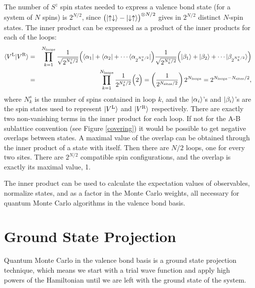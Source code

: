 The number of $S^z$ spin states needed to express a valence bond state (for a system of $N$ spins) is $2^{N/2}$, since $\big(\lvert {\uparrow\downarrow} \rangle-\lvert {\downarrow\uparrow} \rangle \big)^{\otimes N/2}$ gives in $2^{N/2}$ distinct $N$-spin states. 
The inner product can be expressed as a product of the inner products for each of the loops:
\begin{eqnarray}
\langle{V^\text{L}}\vert{V^\text{R}}\rangle &= &
				\prod^{N_{\text{loops}}}_{k=1}
				\frac{1}
				{\sqrt{2^{N^s_k/2}}}
				\Big( \langle {\alpha_1} \rvert + \langle {\alpha_2} \rvert + \cdots \langle {\alpha_{2^{N^s_k/2}}} \rvert\Big)
				\frac{1}
				{\sqrt{2^{N^s_k/2}}} \nonumber
				\Big( \lvert {\beta_1} \rangle + \lvert {\beta_2} \rangle + \cdots \lvert {\beta_{2^{N^s_k/2}}} \rangle\Big)\\
				&=&\prod^{N_{\text{loops}}}_{k=1}
				\frac{1}
				{2^{N^s_k/2}}
				\Big( 2\Big)
				= \left(\frac{1}
				{2^{N_{\text{sites}}/2}}\right)
				 2^{N_{\text{loops}}} 
				 = 2^{N_{\text{loops}} - N_{\text{sites}}/2},
\end{eqnarray}
where $N^s_k$ is the number of spins contained in loop $k$, and the $\lvert {\alpha_i} \rangle$'s and 
$\lvert {\beta_i} \rangle$'s are the spin states used to represent $\lvert {V^\text{L}} \rangle$ and $\lvert {V^\text{R}} \rangle$ respectively.
There are exactly two non-vanishing terms in the inner product for each loop.
If not for the A-B sublattice convention (see Figure \ref{covering}) it would be possible to get negative overlaps between states.
A maximal value of the overlap can be obtained through the inner product of a state with itself.
Then there are $N/2$ loops, one for every two sites.  There are $2^{N/2}$ compatible spin configurations, and the overlap is exactly its maximal value, 1.

The inner product can be used to calculate the expectation values of observables, normalize states, and as a factor in the Monte Carlo weights, all necessary for quantum Monte Carlo algorithms in the valence bond basis. 

\section{Ground State Projection} \label{gsp}

Quantum Monte Carlo in the valence bond basis is a ground state projection technique, 
which means we start with a trial wave function and apply high powers of the Hamiltonian until 
we are left with the ground state of the system. 

